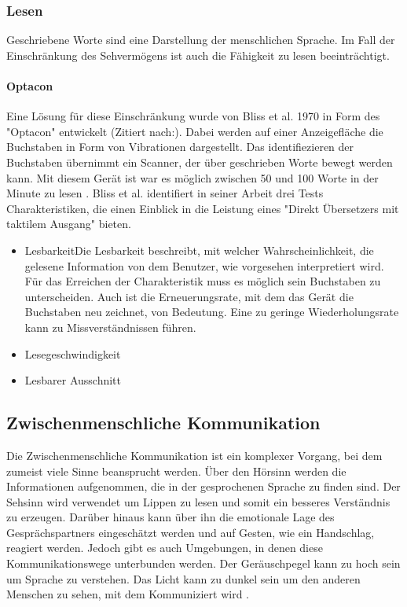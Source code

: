 \documentclass{llncs}					%
\begin{document}
\subsubsection{Lesen} Geschriebene Worte sind eine Darstellung der menschlichen Sprache. Im Fall der Einschränkung des Sehvermögens ist auch die Fähigkeit zu lesen beeinträchtigt.

\paragraph{Optacon} Eine Lösung für diese Einschränkung wurde von Bliss et al. 1970 in Form des "Optacon" entwickelt (Zitiert nach:\cite{doi:10.1518/001872008X250638}). Dabei werden auf einer Anzeigefläche die Buchstaben in Form von Vibrationen dargestellt. Das identifiezieren der Buchstaben übernimmt ein Scanner, der über geschrieben Worte bewegt werden kann. Mit diesem Gerät ist war es möglich zwischen 50 und 100 Worte in der Minute zu lesen \cite{doi:10.1518/001872008X250638}.
Bliss et al. \cite{4081931} identifiert in seiner Arbeit drei Tests Charakteristiken, die einen Einblick in die Leistung eines "Direkt Übersetzers mit taktilem Ausgang" \cite{4081931} bieten.

\begin{itemize}
	\item Lesbarkeit\newline Die Lesbarkeit beschreibt, mit welcher Wahrscheinlichkeit, die gelesene Information von dem Benutzer, wie vorgesehen interpretiert wird. Für das Erreichen der Charakteristik muss es möglich sein Buchstaben zu unterscheiden. Auch ist die Erneuerungsrate, mit dem das Gerät die Buchstaben neu zeichnet, von Bedeutung. Eine zu geringe Wiederholungsrate kann zu Missverständnissen führen.
	\item Lesegeschwindigkeit
	\item Lesbarer Ausschnitt
\end{itemize}


\subsection{Zwischenmenschliche Kommunikation}

Die Zwischenmenschliche Kommunikation ist ein komplexer Vorgang, bei dem zumeist viele Sinne beansprucht werden. Über den Hörsinn werden die Informationen aufgenommen, die in der gesprochenen Sprache zu finden sind. Der Sehsinn wird verwendet um Lippen zu lesen und somit ein besseres Verständnis zu erzeugen. Darüber hinaus kann über ihn die emotionale Lage des Gesprächspartners eingeschätzt werden und auf Gesten, wie ein Handschlag, reagiert werden.
Jedoch gibt es auch Umgebungen, in denen diese Kommunikationswege unterbunden werden. Der Geräuschpegel kann zu hoch sein um Sprache zu verstehen. Das Licht kann zu dunkel sein um den anderen Menschen zu sehen, mit dem Kommuniziert wird \cite{10.2307/1705360}.
\end{document}
